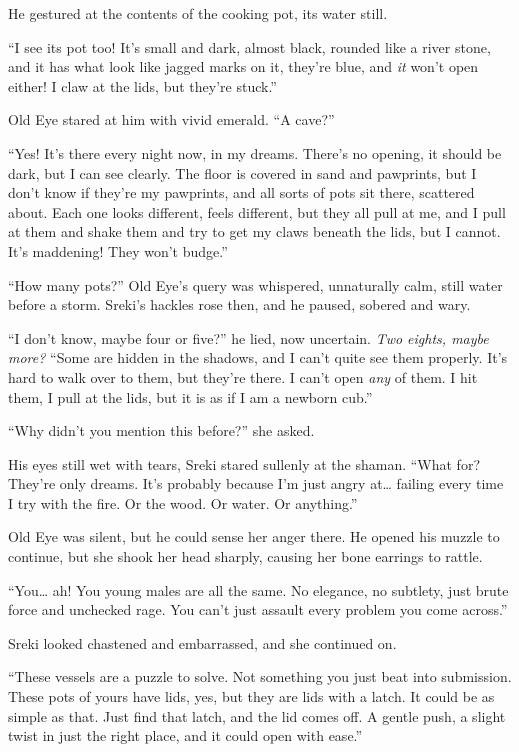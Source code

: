 He gestured at the contents of the cooking pot, its water still.

``I see its pot too! It's small and dark, almost black, rounded like a river stone, and it has what look like jagged marks on it, they're blue, and \emph{it} won't open either! I claw at the lids, but they're stuck.''

Old Eye stared at him with vivid emerald. ``A cave?''

``Yes! It's there every night now, in my dreams. There's no opening, it should be dark, but I can see clearly. The floor is covered in sand and pawprints, but I don't know if they're my pawprints, and all sorts of pots sit there, scattered about. Each one looks different, feels different, but they all pull at me, and I pull at them and shake them and try to get my claws beneath the lids, but I cannot. It's maddening! They won't budge.''

``How many pots?'' Old Eye's query was whispered, unnaturally calm, still water before a storm. Sreki's hackles rose then, and he paused, sobered and wary.

``I don't know, maybe four or five?'' he lied, now uncertain. \emph{Two eights, maybe more?} ``Some are hidden in the shadows, and I can't quite see them properly. It's hard to walk over to them, but they're there. I can't open \emph{any} of them. I hit them, I pull at the lids, but it is as if I am a newborn cub.''

``Why didn't you mention this before?'' she asked.

His eyes still wet with tears, Sreki stared sullenly at the shaman. ``What for? They're only dreams. It's probably because I'm just angry at\ldots{} failing every time I try with the fire. Or the wood. Or water. Or anything.''

Old Eye was silent, but he could sense her anger there. He opened his muzzle to continue, but she shook her head sharply, causing her bone earrings to rattle.

``You\ldots{} ah! You young males are all the same. No elegance, no subtlety, just brute force and unchecked rage. You can't just assault every problem you come across.''

Sreki looked chastened and embarrassed, and she continued on.

``These vessels are a puzzle to solve. Not something you just beat into submission. These pots of yours have lids, yes, but they are lids with a latch. It could be as simple as that. Just find that latch, and the lid comes off. A gentle push, a slight twist in just the right place, and it could open with ease.''

